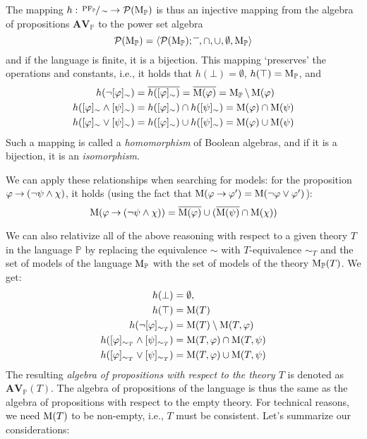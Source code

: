 The mapping $h:\sfrac{\operatorname{PF}_\mathbb{P}}{\sim} \to \mathcal{P}(\operatorname{M}_\mathbb{P})$ is thus an injective mapping from the algebra of propositions $\mathbf{AV}_\mathbb{P}$ to the power set algebra
$$
\mathbf{\mathcal{P}(\operatorname{M}_\mathbb{P})} = \langle \mathcal{P}(\operatorname{M}_\mathbb{P}); \overline{\phantom{x}}, \cap, \cup, \emptyset, \operatorname{M}_\mathbb{P} \rangle
$$
and if the language is finite, it is a bijection. This mapping `preserves' the operations and constants, i.e., it holds that $h(\bot) = \emptyset$, $h(\top) = \operatorname{M}_\mathbb{P}$, and
\begin{align*}
    h(\neg[\varphi]_\sim) &= \overline{h([\varphi]_\sim)} = \overline{\operatorname{M}(\varphi)} = \operatorname{M}_\mathbb{P} \setminus \operatorname{M}(\varphi) \\
    h([\varphi]_\sim \land [\psi]_\sim) &= h([\varphi]_\sim) \cap h([\psi]_\sim) = \operatorname{M}(\varphi) \cap \operatorname{M}(\psi) \\
    h([\varphi]_\sim \lor [\psi]_\sim) &= h([\varphi]_\sim) \cup h([\psi]_\sim) = \operatorname{M}(\varphi) \cup \operatorname{M}(\psi)
\end{align*}
Such a mapping is called a \emph{homomorphism} of Boolean algebras, and if it is a bijection, it is an \emph{isomorphism}.

\begin{remark}
We can apply these relationships when searching for models: for the proposition $\varphi \mathbin{\rightarrow} (\neg \psi \land \chi)$, it holds (using the fact that $\operatorname{M}(\varphi \mathbin{\rightarrow} \varphi') = \operatorname{M}(\neg \varphi \lor \varphi')$):
$$
\operatorname{M}(\varphi \mathbin{\rightarrow} (\neg \psi \land \chi)) = \overline{\operatorname{M}(\varphi)} \cup (\overline{\operatorname{M}(\psi)} \cap \operatorname{M}(\chi))
$$
\end{remark}

We can also relativize all of the above reasoning with respect to a given theory $T$ in the language $\mathbb{P}$ by replacing the equivalence $\sim$ with $T$-equivalence $\sim_T$ and the set of models of the language $\operatorname{M}_\mathbb{P}$ with the set of models of the theory $\operatorname{M}_\mathbb{P}(T)$. We get:
\begin{align*}
    h(\bot) &= \emptyset,\\
    h(\top) &= \operatorname{M}(T)\\
    h(\neg[\varphi]_{\sim_T}) &= \operatorname{M}(T) \setminus \operatorname{M}(T,\varphi)\\
    h([\varphi]_{\sim_T} \land [\psi]_{\sim_T}) &= \operatorname{M}(T,\varphi) \cap \operatorname{M}(T,\psi)\\
    h([\varphi]_{\sim_T} \lor [\psi]_{\sim_T}) &= \operatorname{M}(T,\varphi) \cup \operatorname{M}(T,\psi)
\end{align*}
The resulting \emph{algebra of propositions with respect to the theory $T$} is denoted as $\mathbf{AV}_\mathbb{P}(T)$. The algebra of propositions of the language is thus the same as the algebra of propositions with respect to the empty theory. For technical reasons, we need $\operatorname{M}(T)$ to be non-empty, i.e., $T$ must be consistent. Let's summarize our considerations:

